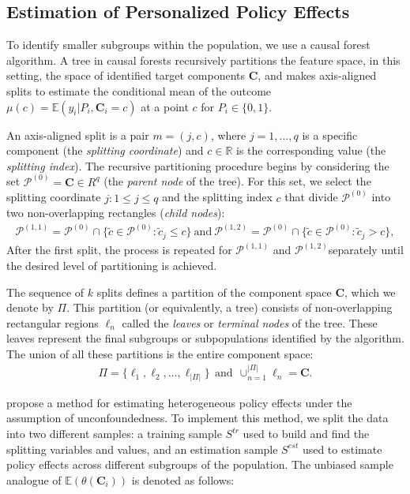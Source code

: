 \documentclass[12pt]{article}
\begin{document}
\subsection{Estimation of Personalized Policy Effects} \label{eq_causal_imp}

To identify smaller subgroups within the population, we use a causal forest algorithm. A tree in causal forests recursively partitions the feature space, in this setting, the space of identified target components $\mathbf{C}$, and makes axis-aligned splits to estimate the conditional mean of the outcome $\mu(c) = \mathbb{E}(y_{i}|P_i, \mathbf{C}_i = c)$ at a point $c$ for $P_i \in \{0, 1\}$.


An axis-aligned split is a pair $m = (j, c)$, where $j = 1, \dots, q$ is a specific component (the \textit{splitting coordinate}) and $c \in \mathbb{R}$ is the corresponding value (the \textit{splitting index}). The recursive partitioning procedure begins by considering the set $\mathcal{P}^{(0)} = \mathbf{C}\in R^{q}$ (the \textit{parent node} of the tree). For this set, we select the splitting coordinate $j: 1 \leq j \leq q$ and the splitting index $c$ that divide $\mathcal{P}^{(0)}$ into two non-overlapping rectangles (\textit{child nodes}): 
\begin{align}
    \mathcal{P}^{(1, 1)} = \mathcal{P}^{(0)} \cap \{\widetilde{c}\in \mathcal{P}^{(0)}: \widetilde{c}_j \leq c\} \ \text{and} \ \mathcal{P}^{(1, 2)} = \mathcal{P}^{(0)} \cap \{\widetilde{c}\in \mathcal{P}^{(0)}: \widetilde{c}_j > c\},
\end{align}
After the first split, the process is repeated for $\mathcal{P}^{(1, 1)}$ and $ \mathcal{P}^{(1, 2)}$separately until the desired level of partitioning is achieved. 


The sequence of $k$ splits defines a partition of the component space $\mathbf{C}$, which we denote by $\Pi$. This partition (or equivalently, a tree) consists of non-overlapping rectangular regions $\ell_n$ called the \textit{leaves} or \textit{terminal nodes} of the tree. These leaves represent the final subgroups or subpopulations identified by the algorithm. The union of all these partitions is the entire component space:
\begin{align*} 
\label{eq_tree} \Pi = \{\ell_1, \ell_2, \dots,  \ell_{|\Pi|}\} \ \  \text{and}  \  \  \cup_{n=1}^{|\Pi|}\ell_n = \mathbf{C}.
\end{align*}

\cite{athey2016recursive} propose a method for estimating heterogeneous policy effects under the assumption of unconfoundedness. To implement this method, we split the data into two different samples: a training sample $S^{tr}$ used to build and find the splitting variables and values, and an estimation sample $S^{est}$ used to estimate policy effects across different subgroups of the population. The unbiased sample analogue of $\mathbb{E}(\theta(\mathbf{C}_i))$ is denoted as follows:
\end{document}
